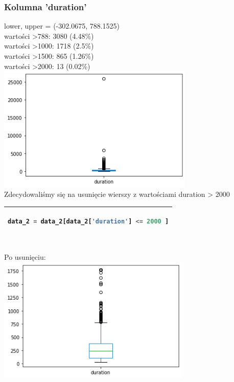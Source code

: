 \documentclass[11pt, a4paper]{article}
\begin{document}
    \newpage
    \subsubsection{Kolumna 'duration'}

    lower, upper = (-302.0675, 788.1525)\\
    wartości >788: 3080 (4.48\%)\\
    wartości >1000: 1718 (2.5\%)\\
    wartości >1500: 865 (1.26\%)\\
    wartości >2000: 13 (0.02\%)\\

    \vspace{0.5cm} 
    \includegraphics[height=170pt]{graphics/duration_before.png}
    \vspace{0.5cm} \\
    
    Zdecydowaliśmy się na usunięcie wierszy z wartościami duration > 2000
    
    \vspace{0.5cm} 
    \begin{tabular}{|l|}
        \hline
        \begin{lstlisting}[language=Python]
data_2 = data_2[data_2['duration'] <= 2000 ]
        \end{lstlisting}
        \\ \hline
    \end{tabular}
    \vspace{0.5cm} \\
    
    Po usunięciu:\\
    
    \includegraphics[height=170pt]{graphics/duration_after.png}
    
\end{document}
